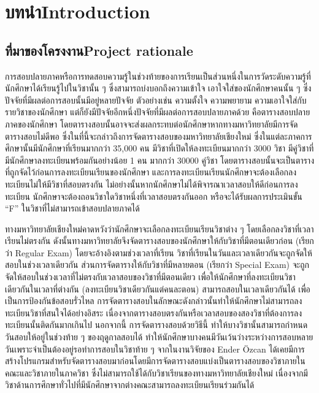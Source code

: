 \chapter{\ifcpe บทนำ\else Introduction\fi}

\section{\ifcpe ที่มาของโครงงาน\else Project rationale\fi}
\label{sec:project_rationale}


การสอบปลายภาคหรือการทดสอบความรู้ในช่วงท้ายของการเรียนเป็นส่วนหนึ่งในการวัดระดับความรู้ที่นักศึกษาได้เรียนรู้ไปในวิชานั้น ๆ
ซึ่งสามารถบ่งบอกถึงความเข้าใจ เอาใจใส่ของนักศึกษาคนนั้น ๆ ซึ่งปัจจัยที่มีผลต่อการสอบนั้นมีอยู่หลายปัจจัย
ตัวอย่างเช่น ความตั้งใจ ความพยายาม ความเอาใจใส่กับรายวิชาของนักศึกษา
แต่ก็ยังมีปัจจัยอีกหนึ่งปัจจัยที่มีผลต่อการสอบปลายภาคด้วย คือตารางสอบปลายภาคของนักศึกษา
โดยตารางสอบนั้นอาจจะส่งผลกระทบต่อนักศึกษาหากทางมหาวิทยาลัยมีการจัดตารางสอบไม่ดีพอ
ซึ่งในที่นี้จะกล่าวถึงการจัดตารางสอบของมหาวิทยาลัยเชียงใหม่ ซึ่งในแต่ละภาคการศึกษานั้นมีนักศึกษาที่เรียนมากกว่า 35,000 คน 
มีวิชาที่เปิดให้ลงทะเบียนมากกว่า 3000 วิชา มีคู่วิชาที่มีนักศึกษาลงทะเบียนพร้อมกันอย่างน้อย 1 คน มากกว่า 30000 คู่วิชา 
โดยตารางสอบนั้นจะเป็นตารางที่ถูกจัดไว้ก่อนการลงทะเบียนเรียนของนักศึกษา 
และการลงทะเบียนเรียนนักศึกษาจะต้องเลือกลงทะเบียนไม่ให้มีวิชาที่สอบตรงกัน
ไม่อย่างนั้นหากนักศึกษาไม่ได้พิจารณาเวลาสอบให้ดีก่อนการลงทะเบียน นักศึกษาจะต้องถอนวิชาใดวิชาหนึ่งที่เวลาสอบตรงกันออก
หรือจะได้รับผลการประเมินขั้น ``F'' ในวิชาที่ไม่สามารถเข้าสอบปลายภาคได้


ทางมหาวิทยาลัยเชียงใหม่คาดหวังว่านักศึกษาจะเลือกลงทะเบียนเรียนวิชาต่าง ๆ
โดยเลือกลงวิชาที่เวลาเรียนไม่ตรงกัน ดังนั้นทางมหาวิทยาลัยจึงจัดตารางสอบของนักศึกษาให้กับวิชาที่มีตอนเดียวก่อน
(เรียกว่า Regular Exam) โดยจะอ้างอิงตามช่วงเวลาที่เรียน วิชาที่เรียนในวันและเวลาเดียวกันจะถูกจัดให้สอบในช่วงเวลาเดียวกัน
ส่วนการจัดตารางให้กับวิชาที่มีหลายตอน (เรียกว่า Special Exam) จะถูกจัดให้สอบในช่วงเวลาที่ไม่ตรงกับเวลาสอบของวิชาที่มีตอนเดียว
เพื่อให้นักศึกษาที่ลงทะเบียนวิชาเดียวกันในเวลาที่ต่างกัน  (ลงทะเบียนวิชาเดียวกันแต่คนละตอน) สามารถสอบในเวลาเดียวกันได้
เพื่อเป็นการป้องกันข้อสอบรั่วไหล 
การจัดตารางสอบในลักษณะดังกล่าวนั้นทําให้นักศึกษาไม่สามารถลงทะเบียนวิชาที่สนใจได้อย่างอิสระ
เนื่องจากตารางสอบตรงกันหรือเวลาสอบของสองวิชาที่ต้องการลงทะเบียนนั้นติดกันมากเกินไป 
นอกจากนี้ การจัดตารางสอบด้วยวิธีนี้ ทำให้บางวิชานั้นสามารถกําหนดวันสอบให้อยู่ในช่วงท้าย ๆ ของฤดูกาลสอบได้ 
ทําให้นักศึกษาบางคนมีวันเว้นว่างระหว่างการสอบหลายวันเพราะจําเป็นต้องอยู่รอทำการสอบในวิชาท้าย ๆ
จากในงานวิจัยของ Ender {\"O}zcan \cite{fes} ได้เคยมีการสร้างโปรแกรมสำหรับจัดตารางสอบมาก่อนโดยมีการจัดตารางสอบแบ่งเป็นตารางสอบของวิชาภายในคณะและวิชาภายในภาควิชา 
ซึ่งไม่สามารถใช้ได้กับวิชาเรียนของทางมหาวิทยาลัยเชียงใหม่ 
เนื่องจากมีวิชาด้านการศึกษาทั่วไปที่มีนักศึกษาจากต่างคณะสามารถลงทะเบียนเรียนร่วมกันได้


